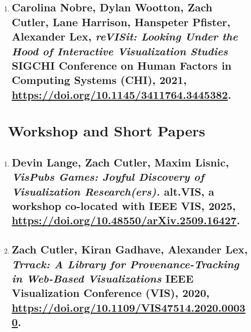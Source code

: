 \begin{enumerate}
\item \subsection{\normalsize Carolina Nobre, Dylan Wootton, \textbf{Zach Cutler}, Lane Harrison, Hanspeter Pfister, Alexander Lex, \textit{reVISit: Looking Under the Hood of Interactive Visualization Studies} SIGCHI Conference on Human Factors in Computing Systems (CHI), 2021, \href{https://doi.org/10.1145/3411764.3445382}{https://doi.org/10.1145/3411764.3445382}.}
\vspace{1ex}
\end{enumerate}


\section{\faFile\ Workshop and Short Papers}
\begin{enumerate}

\item \subsection{\normalsize Devin Lange, \textbf{Zach Cutler}, Maxim Lisnic, \textit{VisPubs Games: Joyful Discovery of Visualization Research(ers).} alt.VIS, a workshop co-located with IEEE VIS, 2025, \href{https://doi.org/10.48550/arXiv.2509.16427}{https://doi.org/10.48550/arXiv.2509.16427}.}
\vspace{1ex}

\item \subsection{\normalsize\textbf{Zach Cutler}, Kiran Gadhave, Alexander Lex, \textit{Trrack: A Library for Provenance-Tracking in Web-Based Visualizations} IEEE Visualization Conference (VIS), 2020, \href{https://doi.org/10.1109/VIS47514.2020.00030}{https://doi.org/10.1109/VIS47514.2020.00030}.}
\vspace{1ex}

\end{enumerate}



